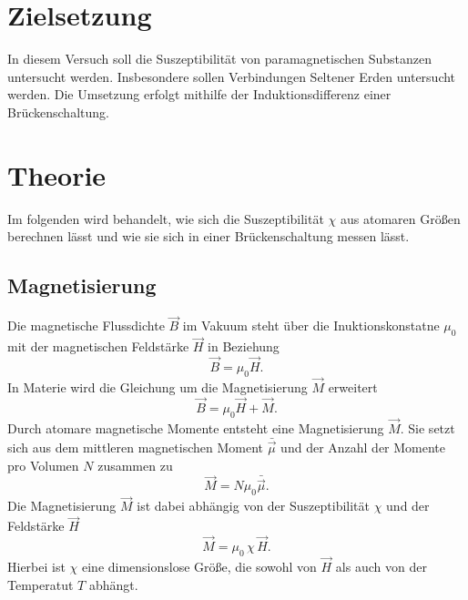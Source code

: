 \section{Zielsetzung}
\label{sec:Zielsetzung}

In diesem Versuch soll die Suszeptibilität von paramagnetischen Substanzen untersucht werden.
Insbesondere sollen Verbindungen Seltener Erden untersucht werden. 
Die Umsetzung erfolgt mithilfe der Induktionsdifferenz einer Brückenschaltung.

\section{Theorie}
\label{sec:Theorie}

Im folgenden wird behandelt, wie sich die Suszeptibilität $χ$ aus atomaren Größen berechnen lässt und
wie sie sich in einer Brückenschaltung messen lässt.

\subsection{Magnetisierung}

Die magnetische Flussdichte $\vec{B}$ im Vakuum steht über die Inuktionskonstatne $μ_0$ mit der magnetischen Feldstärke $\vec{H}$ in Beziehung
\begin{equation*}
    \vec{B} = μ_0 \vec{H}.
\end{equation*}
In Materie wird die Gleichung um die Magnetisierung $\vec{M}$ erweitert
\begin{equation*}
    \vec{B} = μ_0 \vec{H} + \vec{M}.
\end{equation*}
Durch atomare magnetische Momente entsteht eine Magnetisierung $\vec{M}$.
Sie setzt sich aus dem mittleren magnetischen Moment $\bar{\vec{μ}}$ und der Anzahl der Momente pro Volumen $N$ zusammen zu
\begin{equation*}
    \vec{M} = N μ_0 \bar{\vec{μ}}.
\end{equation*}
Die Magnetisierung $\vec{M}$ ist dabei abhängig von der Suszeptibilität $χ$ und der Feldstärke $\vec{H}$
\begin{equation}\label{eqn:Magnetisierung}
    \vec{M} = μ_0\, χ\, \vec{H}.
\end{equation}
Hierbei ist $χ$ eine dimensionslose Größe, die sowohl von $\vec{H}$ als auch von der Temperatut $T$ abhängt.
\\
